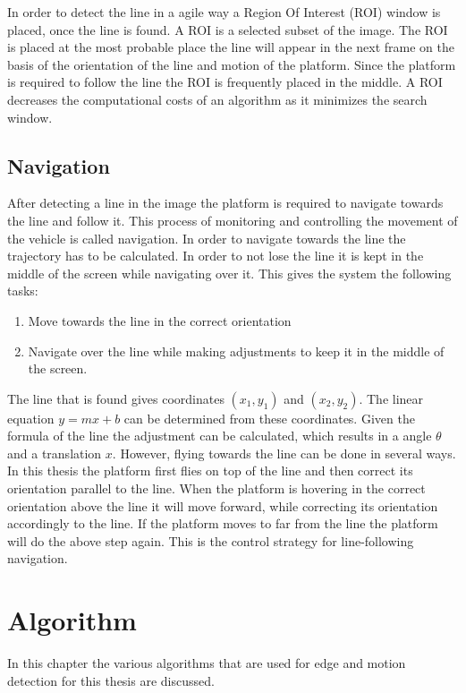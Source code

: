 \documentclass[a4paper]{article}
\begin{document}
In order to detect the line in a agile way a Region Of Interest (ROI) window is placed, once the line is found. A ROI is a selected subset of the image. The ROI is placed at the most probable place the line will appear in the next frame on the basis of the orientation of the line and motion of the platform. Since the platform is required to follow the line the ROI is frequently placed in the middle. A ROI decreases the computational costs of an algorithm as it minimizes the search window.

\subsection{Navigation}
After detecting a line in the image the platform is required to navigate towards the line and follow it. This process of monitoring and controlling the movement of the vehicle is called navigation. In order to navigate towards the line the trajectory has to be calculated. In order to not lose the line it is kept in the middle of the screen while navigating over it. This gives the system the following tasks:
\begin{enumerate}
\item Move towards the line in the correct orientation
\item Navigate over the line while making adjustments to keep it in the middle of the screen.
\end{enumerate}

The line that is found gives coordinates $(x_1, y_1)$ and $(x_2, y_2)$. The linear equation $y = mx + b$ can be determined from these coordinates. Given the formula of the line the adjustment can be calculated, which results in a angle $\theta$ and a translation $x$. However, flying towards the line can be done in several ways. In this thesis the platform first flies on top of the line and then correct its orientation parallel to the line. When the platform is hovering in the correct orientation above the line it will move forward, while correcting its orientation accordingly to the line. If the platform moves to far from the line the platform will do the above step again. This is the control strategy for line-following navigation.

\newpage
\section{Algorithm}
\label{ALGORITHM}
In this chapter the various algorithms that are used for edge and motion detection for this thesis are discussed.
\end{document}
